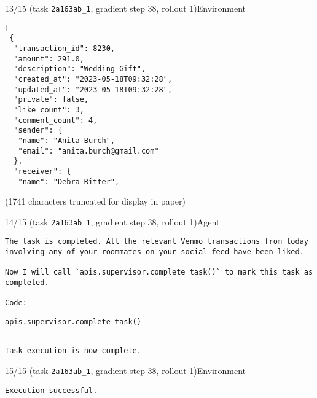 \hspace*{8mm}%
\begin{minipage}{0.95\linewidth}
\begin{user_message_box}{{13/15 (task \texttt{2a163ab\_1}, gradient step 38, rollout 1)\hfill Environment}}
\scriptsize
\begin{Verbatim}[breaklines]
[
 {
  "transaction_id": 8230,
  "amount": 291.0,
  "description": "Wedding Gift",
  "created_at": "2023-05-18T09:32:28",
  "updated_at": "2023-05-18T09:32:28",
  "private": false,
  "like_count": 3,
  "comment_count": 4,
  "sender": {
   "name": "Anita Burch",
   "email": "anita.burch@gmail.com"
  },
  "receiver": {
   "name": "Debra Ritter",
\end{Verbatim}
(1741 characters truncated for display in paper)\end{user_message_box}
\end{minipage}

\begin{minipage}{0.95\linewidth}
\begin{assistant_message_box}{{14/15 (task \texttt{2a163ab\_1}, gradient step 38, rollout 1)\hfill Agent}}
\scriptsize
\begin{Verbatim}[breaklines]
The task is completed. All the relevant Venmo transactions from today involving any of your roommates on your social feed have been liked.

Now I will call `apis.supervisor.complete_task()` to mark this task as completed.

Code:
\end{Verbatim}
\begin{tcolorbox}[colback=codebgcolor,boxrule=0pt]\begin{Verbatim}[breaklines]
apis.supervisor.complete_task()

\end{Verbatim}
\end{tcolorbox}\begin{Verbatim}[breaklines]

Task execution is now complete.
\end{Verbatim}
\end{assistant_message_box}
\end{minipage}

\hspace*{8mm}%
\begin{minipage}{0.95\linewidth}
\begin{user_message_box}{{15/15 (task \texttt{2a163ab\_1}, gradient step 38, rollout 1)\hfill Environment}}
\scriptsize
\begin{Verbatim}[breaklines]
Execution successful.
\end{Verbatim}
\end{user_message_box}
\end{minipage}